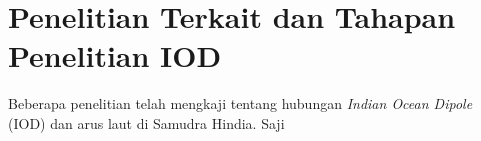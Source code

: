 \vspace{1.5pc}
\vspace{-1pc}
\section[Penelitian Terkait dan Tahapan Penelitian IOD]{Penelitian Terkait dan Tahapan Penelitian IOD}
\begin{spacing}{1.5}
	Beberapa penelitian telah mengkaji tentang hubungan \textit{Indian Ocean Dipole} (IOD) dan arus laut di Samudra Hindia. Saji 
\end{spacing}
\vspace{-1pc}
